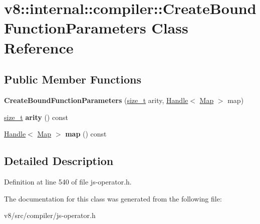 \hypertarget{classv8_1_1internal_1_1compiler_1_1CreateBoundFunctionParameters}{}\section{v8\+:\+:internal\+:\+:compiler\+:\+:Create\+Bound\+Function\+Parameters Class Reference}
\label{classv8_1_1internal_1_1compiler_1_1CreateBoundFunctionParameters}
\subsection*{Public Member Functions}
\begin{DoxyCompactItemize}
\item 
\mbox{\label{classv8_1_1internal_1_1compiler_1_1CreateBoundFunctionParameters_a8a09e85b027682729b528c4153115469}} 
{\bfseries Create\+Bound\+Function\+Parameters} (\mbox{\hyperlink{classsize__t}{size\+\_\+t}} arity, \mbox{\hyperlink{classv8_1_1internal_1_1Handle}{Handle}}$<$ \mbox{\hyperlink{classv8_1_1internal_1_1Map}{Map}} $>$ map)
\item 
\mbox{\label{classv8_1_1internal_1_1compiler_1_1CreateBoundFunctionParameters_a26371d6477965cd046726cf5628e6565}} 
\mbox{\hyperlink{classsize__t}{size\+\_\+t}} {\bfseries arity} () const
\item 
\mbox{\label{classv8_1_1internal_1_1compiler_1_1CreateBoundFunctionParameters_afe8f969a156a0385a695a27ca64e7d71}} 
\mbox{\hyperlink{classv8_1_1internal_1_1Handle}{Handle}}$<$ \mbox{\hyperlink{classv8_1_1internal_1_1Map}{Map}} $>$ {\bfseries map} () const
\end{DoxyCompactItemize}


\subsection{Detailed Description}


Definition at line 540 of file js-\/operator.\+h.



The documentation for this class was generated from the following file\+:\begin{DoxyCompactItemize}
\item 
v8/src/compiler/js-\/operator.\+h\end{DoxyCompactItemize}
